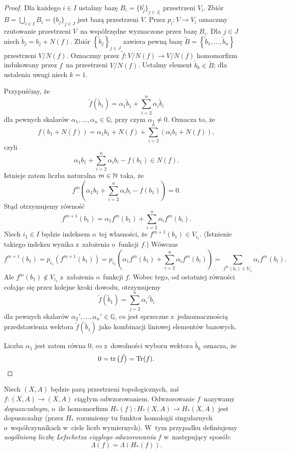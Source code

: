 \begin{proof}
Dla każdego $i\in I$ ustalmy bazę $B_i=\{b_j^i\}_{j\in J_i}$ przestrzeni $V_i$. Zbiór $B=\bigcup_{i\in I} B_i=\{b_j\}_{j\in J}$ jest bazą przestrzeni $V$. Przez $p_i\colon V\to V_i$ oznaczmy rzutowanie przestrzeni $V$~na współrzędne wyznaczone przez bazę $B_i$. Dla $j\in J$ niech $\tilde{b}_j=b_j+N(f)$. Zbiór $\left\{\tilde{b}_j\right\}_{j\in J}$ zawiera pewną bazę $\tilde{B}=\left\{\tilde{b}_1,\ldots,\tilde{b}_n\right\}$ przestrzeni $V\big/N(f)$. Oznaczmy przez $\tilde{f}\colon V\big/N(f)\to V\big/N(f)$ homomorfizm indukowany przez $f$~na przestrzeni $V\big/N(f)$. Ustalmy element $\tilde{b}_k\in \tilde{B}$; dla ustalenia uwagi niech $k=1$.

Przypuśćmy, że \[\tilde{f}\left(\tilde{b}_1\right)=\alpha_1 \tilde{b}_1+\sum_{i=2}^{n}\alpha_i \tilde{b}_i\] dla pewnych skalarów $\alpha_1,\ldots,\alpha_n\in\mathbb{Q}$, przy czym $\alpha_1\not=0$. Oznacza to, że \[f(b_1+N(f))=\alpha_1 b_1+N(f)+\sum_{i=2}^{n}(\alpha_i b_i+N(f)),\] czyli \[\alpha_1 b_1+\sum_{i=2}^{n}\alpha_i b_i - f(b_1)\in N(f).\] Istnieje zatem liczba naturalna $m\in\mathbb{N}$ taka, że \[f^{m}\left(\alpha_1 b_1+\sum_{i=2}^{n}\alpha_i b_i - f(b_1)\right)=0.\] Stąd otrzymujemy równość \[f^{m+1}(b_1)=\alpha_1 f^{m}(b_1)+\sum_{i=2}^{n} \alpha_i f^{m}(b_i).\]
Niech $i_1\in I$ będzie indeksem o~tej własności, że $f^{m+1}(b_1)\in V_{i_1}$. (Istnienie takiego indeksu wynika z~założenia o~funkcji $f$.) Wówczas \[f^{m+1}(b_1)=p_{i_1}\left(f^{m+1}(b_1)\right)=p_{i_1}\left( \alpha_1 f^{m}(b_1)+\sum_{i=2}^{n} \alpha_i f^{m}(b_i)\right )=\sum_{f^m(b_i)\in V_{i_1}} \alpha_i f^{m}(b_i).\] Ale $f^m(b_1)\not\in V_{i_1}$ z~założenia o~funkcji $f$. Wobec tego, od ostatniej równości cofając się przez kolejne kroki dowodu, otrzymujemy \[\tilde{f}\left(\tilde{b}_1\right)=\sum_{j=2}^{n}\alpha_i' \tilde{b}_i\] dla pewnych skalarów $\alpha_2',\ldots,\alpha_n'\in\mathbb{Q}$, co jest sprzeczne z~jednoznacznością przedstawienia wektora $\tilde{f}\left(\tilde{b}_1\right)$ jako kombinacji liniowej elementów bazowych.

Liczba $\alpha_1$ jest zatem równa $0$, co z~dowolności wyboru wektora $\tilde{b}_k$ oznacza, że \[0=\operatorname{tr}\left(\tilde{f}\right)=\operatorname{Tr}(f).\qedhere\]
\end{proof}

Niech $(X,A)$ będzie parą przestrzeni topologicznych, zaś $f\colon (X,A)\to (X,A)$ ciągłym odwzorowaniem. Odwzorowanie $f$~nazywamy \textit{dopuszczalnym}, o~ile homomorfizm $H_*(f)\colon H_*(X,A)\to H_*(X,A)$ jest dopuszczalny (przez $H_*$ rozumiemy tu funktor homologii singularnych o~współczynnikach w~ciele liczb wymiernych). W~tym przypadku definiujemy \textit{uogólnioną liczbę Lefschetza ciągłego  odwzorowania $f$} w~następujący sposób: \[\Lambda(f)=\Lambda(H_*(f)).\]

